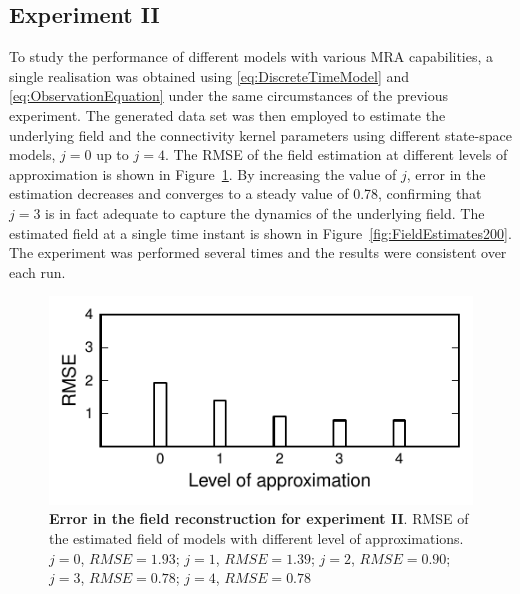 \documentclass[11pt,draftcls,onecolumn,peerreview]{IEEEtran}
\begin{document}
\subsection{Experiment II}
To study the performance of different models with various MRA capabilities, a single realisation was obtained using \eqref{eq:DiscreteTimeModel} and \eqref{eq:ObservationEquation} under the same circumstances of the previous experiment. The generated data set was then employed to estimate the underlying field and the connectivity kernel parameters using different state-space models, $j=0$ up to $j=4$. The RMSE of the field estimation at different levels of approximation is shown in Figure~\ref{fig:RMSE}. By increasing the value of $j$, error in the estimation decreases and converges to a steady value of 0.78, confirming that $j=3$ is in fact adequate to capture the dynamics of the underlying field. The estimated field at a single time instant is shown in Figure~\ref{fig:FieldEstimates200}. The experiment was performed several times and the results were consistent over each run.
 \begin{figure}[!h] 
 	\centering
 		\includegraphics[scale=1]{./Graph/Figure3.pdf}
 		\caption{{\bf Error in the field reconstruction for experiment II}. RMSE of the estimated field of models with different level of approximations. $j=0$, $RMSE = 1.93$; $j=1$, $RMSE = 1.39$; $j=2$, $RMSE = 0.90$; $j=3$, $RMSE = 0.78$; $j=4$, $RMSE=0.78$}
 	\label{fig:RMSE}
 \end{figure} 
\end{document}
